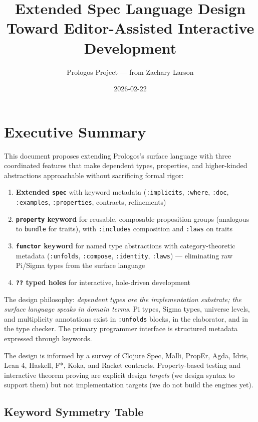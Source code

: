 \documentclass[11pt]{article}
\author{Prologos Project — from Zachary Larson}
\date{2026-02-22}
\title{Extended Spec Language Design\\\medskip
\large Toward Editor-Assisted Interactive Development}
\begin{document}
\maketitle
\tableofcontents

\section{Executive Summary}
\label{sec:org9c2dd4c}

This document proposes extending Prologos's surface language with three
coordinated features that make dependent types, properties, and higher-kinded
abstractions approachable without sacrificing formal rigor:

\begin{enumerate}
\item \textbf{Extended \texttt{spec}} with keyword metadata (\texttt{:implicits}, \texttt{:where}, \texttt{:doc},
\texttt{:examples}, \texttt{:properties}, contracts, refinements)
\item \textbf{\texttt{property} keyword} for reusable, composable proposition groups (analogous
to \texttt{bundle} for traits), with \texttt{:includes} composition and \texttt{:laws} on traits
\item \textbf{\texttt{functor} keyword} for named type abstractions with category-theoretic
metadata (\texttt{:unfolds}, \texttt{:compose}, \texttt{:identity}, \texttt{:laws}) --- eliminating
raw Pi/Sigma types from the surface language
\item \textbf{\texttt{??} typed holes} for interactive, hole-driven development
\end{enumerate}

The design philosophy: \emph{dependent types are the implementation substrate; the
surface language speaks in domain terms}. Pi types, Sigma types, universe
levels, and multiplicity annotations exist in \texttt{:unfolds} blocks, in the
elaborator, and in the type checker. The primary programmer interface is
structured metadata expressed through keywords.

The design is informed by a survey of Clojure Spec, Malli, PropEr, Agda, Idris,
Lean 4, Haskell, F*, Koka, and Racket contracts. Property-based testing and
interactive theorem proving are explicit design \emph{targets} (we design syntax to
support them) but not implementation targets (we do not build the engines yet).
\subsection{Keyword Symmetry Table}
\label{sec:orgcbaef95}
\end{document}
